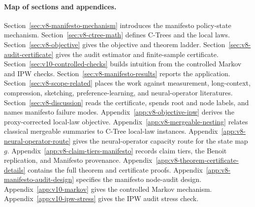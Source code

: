 \paragraph{Map of sections and appendices.}
Section~\ref{sec:v8-manifesto-mechanism} introduces the manifesto
policy-state mechanism. Section~\ref{sec:v8-ctree-math} defines
C-Trees and the local laws. Section~\ref{sec:v8-objective} gives the
objective and theorem ladder. Section~\ref{sec:v8-audit-certificate}
gives the audit estimator and finite-sample certificate.
Section~\ref{sec:v10-controlled-checks} builds intuition from the
controlled Markov and IPW checks.
Section~\ref{sec:v8-manifesto-results} reports the application.
Section~\ref{sec:v8-scope-related} places the work against
measurement, long-context, compression, sketching,
preference-learning, and neural-operator literatures.
Section~\ref{sec:v8-discussion} reads the certificate, spends root
and node labels, and names manifesto failure modes.
Appendix~\ref{app:v8-objective-ipw} derives the proxy-corrected
local-law objective.
Appendix~\ref{app:v8-mergeable-nesting} relates classical mergeable
summaries to C-Tree local-law instances.
Appendix~\ref{app:v8-neural-operator-route} gives the
neural-operator capacity route for the state map \(g\).
Appendix~\ref{app:v8-claim-tiers-manifesto} records claim tiers, the
Benoit replication, and Manifesto provenance.
Appendix~\ref{app:v8-theorem-certificate-details} contains the full
theorem and certificate proofs.
Appendix~\ref{app:v8-manifesto-audit-design} specifies the manifesto
node-audit design.
Appendix~\ref{app:v10-markov} gives the controlled Markov mechanism.
Appendix~\ref{app:v10-ipw-stress} gives the IPW audit stress check.

